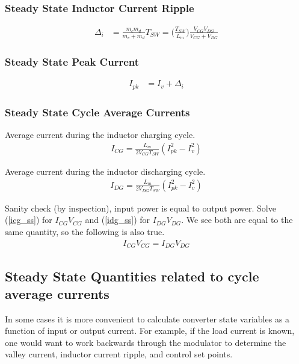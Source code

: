 \documentclass{scrartcl}
\begin{document}
		\subsubsection{Steady State Inductor Current Ripple}
			\begin{align}
			\Delta_i &=  \frac{m_c m_d}{m_c + m_d} T_{SW} = \bigg(\frac{T_{SW}} {L_m}\bigg)\frac{V_{CG} V_{DG}}{V_{CG} + V_{DG}}
			\end{align}	
	
		\subsubsection{Steady State Peak Current}
			\begin{align}
			I_{pk} &=  I_v + \Delta_i \label{ripple}
			\end{align}	
		
		\subsubsection{Steady State Cycle Average Currents}
			Average current during the inductor charging cycle.
			\begin{align}
			I_{CG} = \frac{L_m}{2V_{CG}T_{SW}} (I_{pk}^2 - I_v^2) \label{icg_ss}
			\end{align}	
			
			Average current during the inductor discharging cycle.
			\begin{align}
			I_{DG} = \frac{L_m}{2V_{DG}T_{SW}} (I_{pk}^2 - I_v^2) \label{idg_ss}
			\end{align}	
			
			Sanity check (by inspection), input power is equal to output power. Solve (\ref{icg_ss}) for $I_{CG}V_{CG}$ and (\ref{idg_ss}) for $I_{DG}V_{DG}$.  We see both are equal to the same quantity, so the following is also true.
			\begin{align}
			I_{CG}V_{CG} = I_{DG}V_{DG}  
			\end{align}	
	
	\subsection{Steady State Quantities related to cycle average currents}	
	In some cases it is more convenient to calculate converter state variables as a function of input or output current.  For example, if the load current is known, one would want to work backwards through the modulator to determine the valley current, inductor current ripple, and control set points.
	
\end{document}
